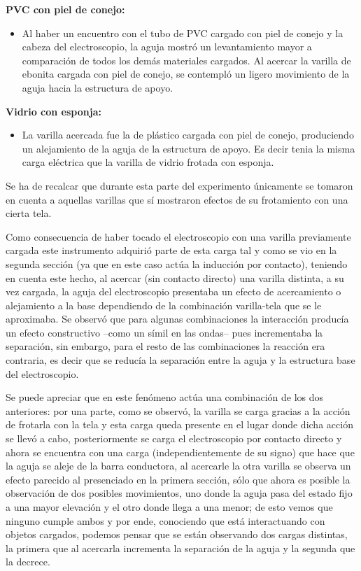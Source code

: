\documentclass[letterpaper, 11 pt]{article}
\begin{document}
\begin{multicols*}{2}
\textbf{PVC con piel de conejo:}
\begin{itemize}[noitemsep]
    \item Al haber un encuentro con el tubo de PVC cargado con piel de conejo y la cabeza del electroscopio, la aguja mostró un levantamiento mayor a comparación de todos los demás materiales cargados.
    Al acercar la varilla de ebonita cargada con piel de conejo, se contempló un ligero movimiento de la aguja hacia la estructura de apoyo.
\end{itemize}

\textbf{Vidrio con esponja:}
\begin{itemize}[noitemsep]
    \item La varilla acercada fue la de plástico cargada con piel de conejo, produciendo un alejamiento de la aguja de la estructura de apoyo. Es decir tenia la misma carga eléctrica que la varilla de vidrio frotada con esponja.
\end{itemize}

Se ha de recalcar que durante esta parte del experimento únicamente se tomaron en cuenta a aquellas varillas que sí mostraron efectos de su frotamiento con una cierta tela. 

Como consecuencia de haber tocado el electroscopio con una varilla previamente cargada este instrumento adquirió parte de esta carga tal y como se vio en la segunda sección (ya que en este caso actúa la inducción por contacto), teniendo en cuenta este hecho, al acercar (sin contacto directo) una varilla distinta, a su vez cargada, la aguja del electroscopio presentaba un efecto de acercamiento o alejamiento a la base dependiendo de la combinación varilla-tela que se le aproximaba. Se observó que para algunas combinaciones la interacción producía un efecto constructivo --como un símil en las ondas-- pues incrementaba la separación, sin embargo, para el resto de las combinaciones la reacción era contraria, es decir que se reducía la separación entre la aguja y la estructura base del electroscopio. 

Se puede apreciar que en este fenómeno actúa una combinación de los dos anteriores: por una parte, como se observó, la varilla se carga gracias a la acción de frotarla con la tela y esta carga queda presente en el lugar donde dicha acción se llevó a cabo, posteriormente se carga el electroscopio por contacto directo y ahora se encuentra con una carga (independientemente de su signo) que hace que la aguja se aleje de la barra conductora, al acercarle la otra varilla se observa un efecto parecido al presenciado en la primera sección, sólo que ahora es posible la observación de dos posibles movimientos, uno donde la aguja pasa del estado fijo a una mayor elevación y el otro donde llega a una menor; de esto vemos que ninguno cumple ambos y por ende, conociendo que está interactuando con objetos cargados, podemos pensar que se están observando dos cargas distintas, la primera que al acercarla incrementa la separación de la aguja y la segunda que la decrece.



\end{multicols*}
\end{document}
